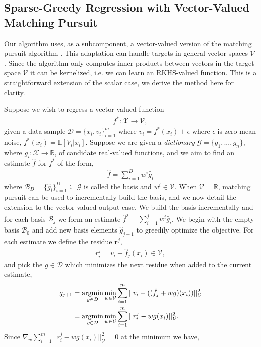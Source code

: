 \documentclass[letterpaper]{article}
\newcommand{\MallatMatchingPursuit}{DBLP:journals/tsp/MallatZ93}
\newcommand{\cD}{{\mathcal D}}
\newcommand{\cB}{{\mathcal B}}
\newcommand{\cV}{{\mathcal V}}
\newcommand{\cX}{{\mathcal X}}
\newcommand{\cG}{{\mathcal G}}
\newcommand{\br}{{\bm r}}
\newcommand{\E}{{\mathbb E}}
\newcommand{\R}{{\mathbb R}}
\newcommand{\argmin}{\operatornamewithlimits{argmin}}
\newcommand{\nn}{\nonumber}
\begin{document}
\subsection{Sparse-Greedy Regression with Vector-Valued Matching Pursuit}

Our algorithm uses, as a subcomponent, a vector-valued version of the matching pursuit algorithm \citep{\MallatMatchingPursuit}. This adaptation can handle targets in general vector spaces $\cV$. Since the algorithm only computes inner products between vectors in the target space $\cV$ it can be kernelized, i.e. we can learn an RKHS-valued function. This is a straightforward extension of the scalar case, we derive the method here for clarity.

Suppose we wish to regress a vector-valued function
\begin{align}
f^*:\cX\to\cV, \nn
\end{align}
given a data sample $\cD = \{x_i,v_i\}_{i=1}^m$ where $v_i = f^*(x_i)+\epsilon$ where $\epsilon$ is zero-mean noise, $f^*(x_i) = \E[V_i|x_i]$. Suppose we are given a \emph{dictionary} $\cG = \{g_1,...,g_n\}$, where $g_i:\cX\to\R$, of candidate real-valued functions, and we aim to find an estimate $\hat f$ for $f^*$ of the form,
\begin{align}
\hat f = \sum_{i=1}^D w^i \hat g_i \nn
\end{align}
where $\cB_D = \{ \hat g_i \}_{i=1}^D \subseteq \cG$ is called the basis and $w^i\in\cV$. When $\cV=\R$, matching pursuit \cite{\MallatMatchingPursuit} can be used to incrementally build the basis, and we now detail the extension to the vector-valued output case. We build the basis incrementally and for each basis $\cB_j$ we form an estimate $\hat f^j = \sum_{i=1}^j w^i \hat g_i$. We begin with the empty basis $\cB_0$  and add new basis elements $\hat g_{j+1}$ to greedily optimize the objective. For each estimate we define the residue $\br^j$,
\begin{align}
r^j_i = v_i - \hat f_j(x_i) \in\cV , \nn
\end{align}
and pick the $g\in\cD$ which minimizes the next residue when added to the current estimate,
\begin{align}
g_{j+1} &= \argmin_{g\in\cD}\min_{w \in\cV} \sum_{i=1}^m ||v_i - ( (\hat f_j + w g) (x_i)  )||_{\cV}^2 \nn\\
&=\argmin_{g\in\cD}\min_{w\in\cV} \sum_{i=1}^m ||r^j_i -  w g(x_i)  ||_{\cV}^2. \nn
\end{align}
Since $\nabla_{w}  \sum_{i=1}^m ||r^j_i -  w g(x_i)  ||_\cV^2  = 0$ at the minimum we have,
\end{document}

